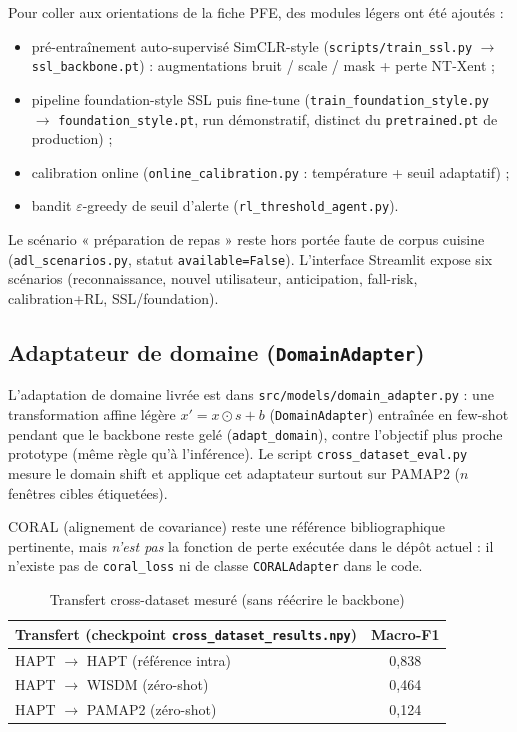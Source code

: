 \documentclass[a4paper,12pt]{report}
\begin{document}
Pour coller aux orientations de la fiche PFE, des modules légers ont été
ajoutés :
\begin{itemize}
  \item pré-entraînement auto-supervisé SimCLR-style
  (\texttt{scripts/train\_ssl.py} $\rightarrow$ \texttt{ssl\_backbone.pt}) :
  augmentations bruit / scale / mask + perte NT-Xent ;
  \item pipeline foundation-style SSL puis fine-tune
  (\texttt{train\_foundation\_style.py} $\rightarrow$ \texttt{foundation\_style.pt},
  run démonstratif, distinct du \texttt{pretrained.pt} de production) ;
  \item calibration online
  (\texttt{online\_calibration.py} : température + seuil adaptatif) ;
  \item bandit $\varepsilon$-greedy de seuil d'alerte
  (\texttt{rl\_threshold\_agent.py}).
\end{itemize}
Le scénario « préparation de repas » reste hors portée faute de corpus cuisine
(\texttt{adl\_scenarios.py}, statut \texttt{available=False}). L'interface
Streamlit expose six scénarios (reconnaissance, nouvel utilisateur,
anticipation, fall-risk, calibration+RL, SSL/foundation).

\subsection{Adaptateur de domaine (\texttt{DomainAdapter})}

L'adaptation de domaine livrée est dans \texttt{src/models/domain\_adapter.py} :
une transformation affine légère $x' = x \odot s + b$ (\texttt{DomainAdapter})
entraînée en few-shot pendant que le backbone reste gelé
(\texttt{adapt\_domain}), contre l'objectif plus proche prototype (même règle
qu'à l'inférence). Le script \texttt{cross\_dataset\_eval.py} mesure le
domain shift et applique cet adaptateur surtout sur PAMAP2 ($n$ fenêtres
cibles étiquetées).

CORAL \parencite{sun2016} (alignement de covariance) reste une référence
bibliographique pertinente, mais \emph{n'est pas} la fonction de perte
exécutée dans le dépôt actuel : il n'existe pas de \texttt{coral\_loss} ni de
classe \texttt{CORALAdapter} dans le code.

\begin{table}[H]
\centering
\small
\begin{tabularx}{0.88\textwidth}{|Y|c|}
\hline
\textbf{Transfert (checkpoint \texttt{cross\_dataset\_results.npy})} & \textbf{Macro-F1} \\
\hline
HAPT $\rightarrow$ HAPT (référence intra) & 0,838 \\
HAPT $\rightarrow$ WISDM (zéro-shot) & 0,464 \\
HAPT $\rightarrow$ PAMAP2 (zéro-shot) & 0,124 \\
\hline
\end{tabularx}
\caption{Transfert cross-dataset mesuré (sans réécrire le backbone)}
\label{tab:coral_impl}
\end{table}
\end{document}
